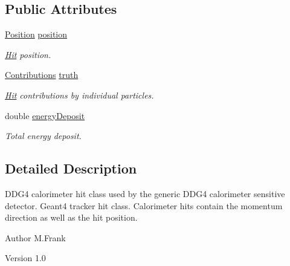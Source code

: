 \subsection*{Public Attributes}
\begin{DoxyCompactItemize}
\item 
\hyperlink{namespace_d_d4hep_1_1_simulation_ad6fd94b3439e31d1ba4b2e640d578558}{Position} \hyperlink{class_d_d4hep_1_1_simulation_1_1_geant4_calorimeter_1_1_hit_acab4633ca2b899307b1bbb47a22f0e74}{position}
\begin{DoxyCompactList}\small\item\em \hyperlink{class_d_d4hep_1_1_simulation_1_1_geant4_calorimeter_1_1_hit}{Hit} position. \item\end{DoxyCompactList}\item 
\hyperlink{class_d_d4hep_1_1_simulation_1_1_geant4_hit_data_aee3759a12612c2f2712e44f87e343a2f}{Contributions} \hyperlink{class_d_d4hep_1_1_simulation_1_1_geant4_calorimeter_1_1_hit_a7e22969405a034dc2f0deb3df1606d0d}{truth}
\begin{DoxyCompactList}\small\item\em \hyperlink{class_d_d4hep_1_1_simulation_1_1_geant4_calorimeter_1_1_hit}{Hit} contributions by individual particles. \item\end{DoxyCompactList}\item 
double \hyperlink{class_d_d4hep_1_1_simulation_1_1_geant4_calorimeter_1_1_hit_a5d9a6b22529494a8b8e4a9f3f8df9162}{energyDeposit}
\begin{DoxyCompactList}\small\item\em Total energy deposit. \item\end{DoxyCompactList}\end{DoxyCompactItemize}


\subsection{Detailed Description}
DDG4 calorimeter hit class used by the generic DDG4 calorimeter sensitive detector. Geant4 tracker hit class. Calorimeter hits contain the momentum direction as well as the hit position.

\begin{DoxyAuthor}{Author}
M.Frank 
\end{DoxyAuthor}
\begin{DoxyVersion}{Version}
1.0 
\end{DoxyVersion}


